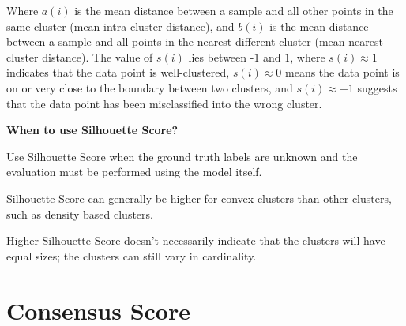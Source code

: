 \begin{center}
\end{center}

Where  $a(i)$ is the mean distance between a sample and all other points in the same cluster (mean intra-cluster distance), 
and  $b(i)$ is the mean distance between a sample and all points in the nearest different cluster (mean nearest-cluster distance). 
The value of  $s(i)$ lies between -$1$ and  $1$, where  $s(i) \approx 1$ indicates that the data point is well-clustered, 
 $s(i) \approx 0$ means the data point is on or very close to the boundary between two clusters, and  $s(i) \approx -1$ 
suggests that the data point has been misclassified into the wrong cluster.

\textbf{When to use Silhouette Score?}

Use Silhouette Score when the ground truth labels are unknown and the evaluation must be performed using the model itself.

{
\item Silhouette Score can generally be higher for convex clusters than other clusters, such as density based clusters.
\item Higher Silhouette Score doesn't necessarily indicate that the clusters will have equal sizes; the clusters can still vary in cardinality. 
}

\clearpage
\thispagestyle{clusteringstyle}
\section{ Consensus Score}
